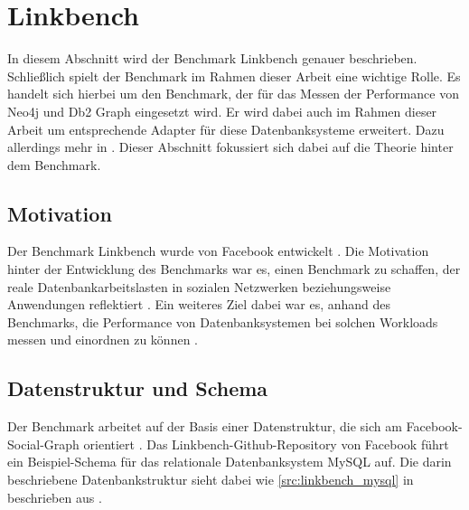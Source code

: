 \section{Linkbench}
\label{linkbench}
In diesem Abschnitt wird der Benchmark Linkbench genauer beschrieben. Schließlich spielt der Benchmark im Rahmen dieser Arbeit eine wichtige Rolle. Es handelt sich hierbei um den Benchmark, der für das Messen der Performance von Neo4j und Db2 Graph eingesetzt wird. Er wird dabei auch im Rahmen dieser Arbeit um entsprechende Adapter für diese Datenbanksysteme erweitert. Dazu allerdings mehr in . Dieser Abschnitt fokussiert sich dabei auf die Theorie hinter dem Benchmark. 

\subsection{Motivation}
Der Benchmark Linkbench wurde von Facebook entwickelt \cite{linkbench_paper}. Die Motivation hinter der Entwicklung des Benchmarks war es, einen Benchmark zu schaffen, der reale Datenbankarbeitslasten in sozialen Netzwerken beziehungsweise Anwendungen reflektiert \cite{linkbench_paper}. Ein weiteres Ziel dabei war es, anhand des Benchmarks, die Performance von Datenbanksystemen bei solchen Workloads messen und einordnen zu können \cite{linkbench_paper}.

\subsection{Datenstruktur und Schema}
Der Benchmark arbeitet auf der Basis einer Datenstruktur, die sich am Facebook-Social-Graph orientiert \cite{linkbench_paper}. Das Linkbench-Github-Repository \cite{fb_linkbench_github} von Facebook führt ein Beispiel-Schema für das relationale Datenbanksystem MySQL auf. Die darin beschriebene Datenbankstruktur sieht dabei wie \autoref{src:linkbench_mysql} in beschrieben aus \cite{fb_linkbench_github}. 

